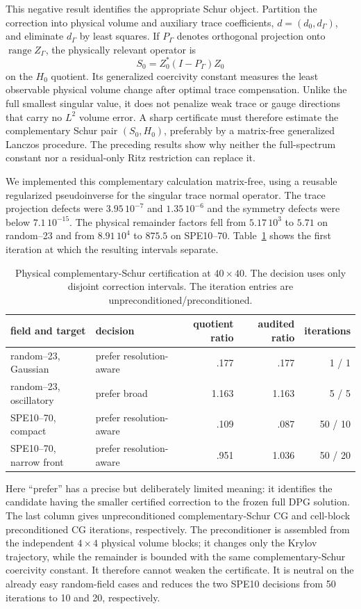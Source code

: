 \documentclass[11pt]{article}
\numberwithin{algorithm}{section}
\theoremstyle{definition}\newtheorem{definition}[theorem]{Definition}
\theoremstyle{remark}\newtheorem{remark}[theorem]{Remark}
\begin{document}
This negative result identifies the appropriate Schur object.  Partition the
correction into physical volume and auxiliary trace coefficients,
$d=(d_0,d_\Gamma)$, and eliminate $d_\Gamma$ by least squares.  If
$P_\Gamma$ denotes orthogonal projection onto $\operatorname{range}Z_\Gamma$,
the physically relevant operator is
\[
 S_0=Z_0^*(I-P_\Gamma)Z_0
\]
on the $H_0$ quotient.  Its generalized coercivity constant measures the
least observable physical volume change after optimal trace compensation.
Unlike the full smallest singular value, it does not penalize weak trace or
gauge directions that carry no $L^2$ volume error.  A sharp certificate must
therefore estimate the complementary Schur pair $(S_0,H_0)$, preferably by a
matrix-free generalized Lanczos procedure.  The preceding results show why
neither the full-spectrum constant nor a residual-only Ritz restriction can
replace it.

We implemented this complementary calculation matrix-free, using a reusable
regularized pseudoinverse for the singular trace normal operator.  The trace
projection defects were $3.95\,10^{-7}$ and $1.35\,10^{-6}$ and the symmetry
defects were below $7.1\,10^{-15}$.  The physical remainder factors fell from
$5.17\,10^3$ to $5.71$ on random--23 and from $8.91\,10^4$ to $875.5$ on
SPE10--70.  Table~\ref{tab:physical-schur-decisions} shows the first iteration
at which the resulting intervals separate.

\begin{table}[t]
\centering
\caption{Physical complementary-Schur certification at $40\times40$.  The
decision uses only disjoint correction intervals.  The iteration entries are
unpreconditioned/preconditioned.}
\begin{tabular}{llrrr}
\toprule
field and target & decision & quotient ratio & audited ratio & iterations\\
\midrule
random--23, Gaussian & prefer resolution-aware & .177 & .177 & 1 / 1\\
random--23, oscillatory & prefer broad & 1.163 & 1.163 & 5 / 5\\
SPE10--70, compact & prefer resolution-aware & .109 & .087 & 50 / 10\\
SPE10--70, narrow front & prefer resolution-aware & .951 & 1.036 & 50 / 20\\
\bottomrule
\end{tabular}
\label{tab:physical-schur-decisions}
\end{table}

Here ``prefer'' has a precise but deliberately limited meaning: it identifies
the candidate having the smaller certified correction to the frozen full DPG
solution.  The last column gives unpreconditioned complementary-Schur CG and
cell-block preconditioned CG iterations, respectively.  The preconditioner is
assembled from the independent $4\times4$ physical volume blocks; it changes
only the Krylov trajectory, while the remainder is bounded with the same
complementary-Schur coercivity constant.  It therefore cannot weaken the
certificate.  It is neutral on the already easy random-field cases and reduces
the two SPE10 decisions from 50 iterations to 10 and 20, respectively.
\end{document}
